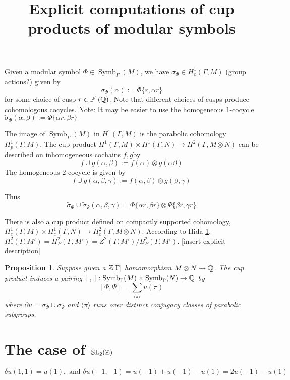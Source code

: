 \documentclass[12pt]{article}
\newtheorem{prop}[thm]{Proposition}
\theoremstyle{definition}
\def\Z{{\Bbb Z}}
\def\Q{{\Bbb Q}}
\def\P{\mathbb{P}}
\def\SL{\operatorname{SL}}
\def\Symb{\operatorname{Symb}}
\def\P{\mathbb{P}}
\begin{document}
\title{Explicit computations of cup products of modular symbols}
\maketitle


Given a modular symbol $\Phi\in\Symb_\Gamma(M)$, we have $\sigma_\Phi \in H^1_c(\Gamma,M)$ (group actions?) given by
$$\sigma_\Phi(\alpha) :=\Phi\{r,\alpha r\}$$
for some choice of cusp $r\in \P^1(\Q)$. Note that different choices of cusps produce cohomologous cocycles.
Note: It may be easier to use the homogeneous $1$-cocycle $\widetilde{\sigma}_{\Phi}(\alpha,\beta):=\Phi\{\alpha r,\beta r\}$

The image of $\Symb_\Gamma(M)$ in $H^1(\Gamma,M)$ is the parabolic cohomology $H^1_p(\Gamma,M)$. The cup product  $H^1(\Gamma,M)\times H^1(\Gamma,N)\rightarrow H^2(\Gamma,M\otimes N)$ can be described on inhomogeneous cochains $f,g$by
$$ f\cup g (\alpha,\beta):=f(\alpha)\otimes g(\alpha\beta)$$
The homogeneous $2$-cocycle is given by
$$ f\cup g (\alpha,\beta,\gamma):=f(\alpha,\beta) \otimes g(\beta,\gamma)$$

Thus
$$\widetilde{\sigma}_\Phi \cup \widetilde{\sigma}_\Psi(\alpha,\beta,\gamma)= \Phi\{\alpha r,\beta r\}\otimes\Psi\{\beta r,\gamma r\}$$

There is also a cup product defined on compactly supported cohomology, $H^1_c(\Gamma,M)\times H^1_c(\Gamma,N)\rightarrow H^2_c(\Gamma,M\otimes N)$. According to Hida \ref{}, $H^2_c(\Gamma, M')=H^2_P(\Gamma,M')=Z^2(\Gamma,M')/B_P^2(\Gamma,M')$. [insert explicit description]

\begin{prop}
Suppose given a $\Z[\Gamma]$ homomorphism $M\otimes N\rightarrow \Q$. The cup product induces a pairing $[~,~] : \Symb_\Gamma(M)\times \Symb_\Gamma(N) \rightarrow \Q$ by
$$[\Phi,\Psi]=\sum_{\langle \pi\rangle } u(\pi)$$
where $\partial u= \sigma_\Phi \cup \sigma_\Psi$ and $\langle \pi\rangle $ runs over distinct conjugacy classes of parabolic subgroups.
\end{prop}

\section{The case of $\SL_2(\Z)$}
\begin{equation*}
	\delta u(1,1)=u(1), \text{ and } \delta u(-1,-1) =u(-1)+u(-1)-u(1)=2u(-1)-u(1)
\end{equation*}
\end{document}
